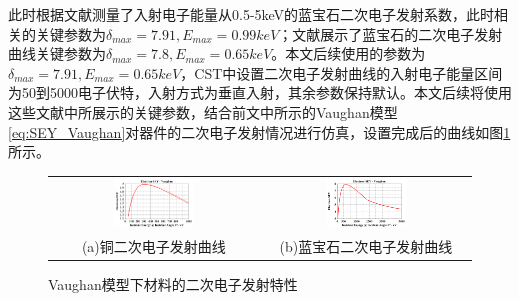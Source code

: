\documentclass[master]{thesis-uestc}
\begin{document}
此时根据文献\cite{suharyanto_2006_secondary}测量了入射电子能量从0.5-5keV的蓝宝石二次电子发射系数，此时相关的关键参数为$\delta_{max}=7.91, E_{max}=0.99keV$；文献\cite{chvyreva_2014_experimental}展示了蓝宝石的二次电子发射曲线关键参数为$\delta_{max}=7.8, E_{max}=0.65keV$。本文后续使用的参数为$\delta_{max}=7.91, E_{max}=0.65keV$，CST中设置二次电子发射曲线的入射电子能量区间为50到5000电子伏特，入射方式为垂直入射，其余参数保持默认。本文后续将使用这些文献中所展示的关键参数，结合前文中所示的Vaughan模型\ref{eq:SEY_Vaughan}对器件的二次电子发射情况进行仿真，设置完成后的曲线如图\ref{fig:X波段材料二次电子发射特性}所示。
\begin{figure}[!htb]
    \small
    \centering
    \begin{tabular}{@{\ }c@{\ }c}
        \includegraphics[width=0.4\textwidth]{pic/chapter3/铜的SEY.png} & 
        \hspace{5pt}
        \includegraphics[width=0.4\textwidth]{pic/chapter3/蓝宝石的SEY.png}     \\
        \mbox{\small (a)铜二次电子发射曲线}                                                                               & 
        \mbox{\small (b)蓝宝石二次电子发射曲线}                                                                                  \\
    \end{tabular}
    \caption{Vaughan模型下材料的二次电子发射特性}
    \label{fig:X波段材料二次电子发射特性}
\end{figure}
\end{document}
